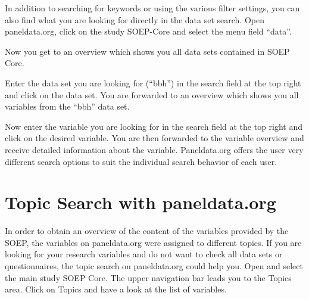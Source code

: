 \documentclass[letterpaper,10pt,openany,onesideH,english]{sphinxmanual}
\begin{document}
In addition to searching for keywords or using the various filter settings, you can also find what you are looking for directly in the data set search. Open paneldata.org, click on the study SOEP-Core and select the menu field “data”.

\begin{figure}[H]
\centering

\noindent{}
\end{figure}

Now you get to an overview which shows you all data sets contained in SOEP Core.

\begin{figure}[H]
\centering

\noindent{}
\end{figure}

Enter the data set you are looking for (“bbh”) in the search field at the top right and click on the data set. You are forwarded to an overview which shows you all variables from the “bbh” data set.

\begin{figure}[H]
\centering

\noindent{}
\end{figure}

Now enter the variable you are looking for in the search field at the top right and click on the desired variable. You are then forwarded to the variable overview and receive detailed information about the variable.
Paneldata.org offers the user very different search options to suit the individual search behavior of each user.


\section{Topic Search with paneldata.org}
\label{\detokenize{Working with SOEP Documentation/index:topic-search-with-paneldata-org}}\label{\detokenize{Working with SOEP Documentation/index:topic}}
In order to obtain an overview of the content of the variables provided by the SOEP, the variables on paneldata.org were assigned to different topics. If you are looking for your research variables and do not want to check all data sets or questionnaires, the topic search on paneldata.org could help you.
Open  and select the main study SOEP Core. The upper navigation bar leads you to the Topics area. Click on Topics and have a look at the list of variables.
\end{document}
